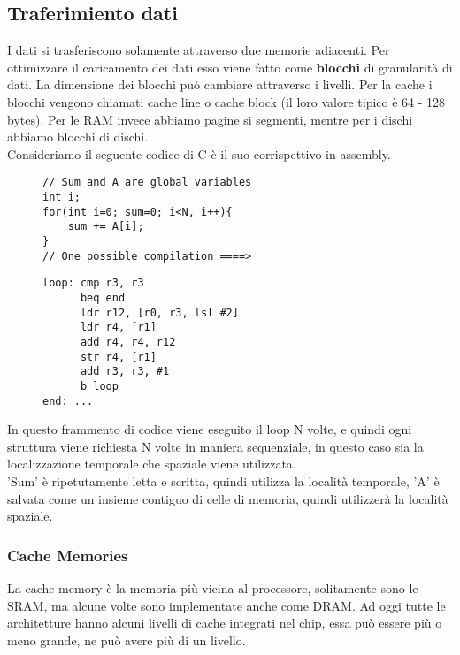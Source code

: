 \subsection{Traferimiento dati}
I dati si trasferiscono solamente attraverso due memorie adiacenti. Per ottimizzare il caricamento dei dati esso viene fatto come \textbf{blocchi} di granularità di dati. La dimensione dei blocchi può cambiare attraverso i livelli. Per la cache i blocchi vengono chiamati cache line o cache block (il loro valore tipico è 64 - 128 bytes). Per le RAM invece abbiamo pagine si segmenti, mentre per i dischi abbiamo blocchi di dischi.\\

\hspace{-15pt}Consideriamo il seguente codice di C è il suo corrispettivo in assembly.
\begin{figure}[!h]
\begin{minipage}[t]{0.45\linewidth}
\centering
\begin{lstlisting}
// Sum and A are global variables
int i;
for(int i=0; sum=0; i<N, i++){
    sum += A[i];
}
// One possible compilation ====>
\end{lstlisting}
\end{minipage}
\hspace{.35cm}
\begin{minipage}[t]{0.45\linewidth}
\begin{lstlisting}
loop: cmp r3, r3
      beq end
      ldr r12, [r0, r3, lsl #2]
      ldr r4, [r1]
      add r4, r4, r12
      str r4, [r1]
      add r3, r3, #1
      b loop
end: ...
\end{lstlisting}
\end{minipage}
\end{figure}

In questo frammento di codice viene eseguito il loop N volte, e quindi ogni struttura viene richiesta N volte in maniera sequenziale, in questo caso sia la localizzazione temporale che spaziale viene utilizzata.\\
'Sum' è ripetutamente letta e scritta, quindi utilizza la località temporale, 'A' è salvata come un insieme contiguo di celle di memoria, quindi utilizzerà la località spaziale.

\subsubsection{Cache Memories}
La cache memory è la memoria più vicina al processore, solitamente sono le SRAM, ma alcune volte sono implementate anche come DRAM. Ad oggi tutte le architetture hanno alcuni livelli di cache integrati nel chip, essa può essere più o meno grande, ne può avere più di un livello.

